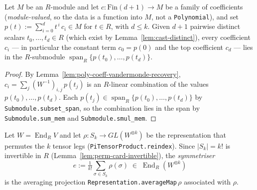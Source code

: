 \begin{lemma}
    \label{lem:poly-coeff-in-span}
    \leanok
    Let $M$ be an $R$-module and let $c : \mathrm{Fin}(d+1) \to M$ be a family of coefficients
    (\emph{module-valued}, so the data is a function into $M$, not a \texttt{Polynomial}), and set
    $p(t) := \sum_{i=0}^{d} t^{\,i}\, c_i \in M$ for $t \in R$, with $d \le k$. Given $d+1$ pairwise
    distinct scalars $t_0, \ldots, t_d \in R$ (which exist by Lemma~\ref{lem:cast-distinct}), every
    coefficient $c_i$ — in particular the constant term $c_0 = p(0)$ and the top coefficient $c_d$ — lies
    in the $R$-submodule $\operatorname{span}_R\{p(t_0), \ldots, p(t_d)\}$.
\end{lemma}
\begin{proof}
    By Lemma~\ref{lem:poly-coeff-vandermonde-recovery}, $c_i = \sum_j (W^{-1})_{i,j}\, p(t_j)$ is an
    $R$-linear combination of the values $p(t_0), \ldots, p(t_d)$. Each $p(t_j) \in
    \operatorname{span}_R\{p(t_0), \ldots, p(t_d)\}$ by \texttt{Submodule.subset\_span}, so the combination
    lies in the span by \texttt{Submodule.sum\_mem} and \texttt{Submodule.smul\_mem}.
\end{proof}

\begin{definition}
    \label{def:symmetriser}
    \leanok
    Let $W = \operatorname{End}_R V$ and let $\rho : S_k \to GL(W^{\otimes k})$ be the representation that
    permutes the $k$ tensor legs (\texttt{PiTensorProduct.reindex}). Since $|S_k| = k!$ is invertible in
    $R$ (Lemma~\ref{lem:perm-card-invertible}), the \emph{symmetriser}
    \[
        e := \tfrac{1}{k!}\sum_{\sigma \in S_k} \rho(\sigma) \;\in\; \operatorname{End}_R(W^{\otimes k})
    \]
    is the averaging projection \texttt{Representation.averageMap}\,$\rho$ associated with $\rho$.
\end{definition}

